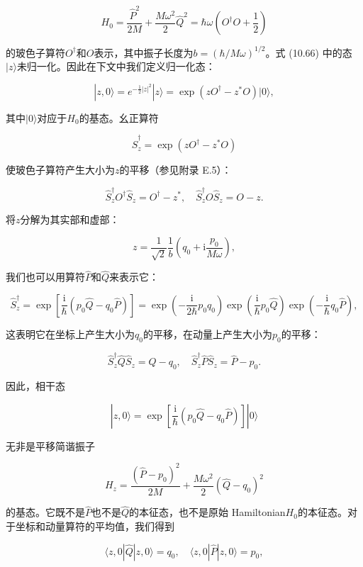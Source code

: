 \[
H_{0}=\frac{\hat{P}^{2}}{2M}+\frac{M\omega^{2}}{2}\hat{Q}^{2}=\hbar\omega\left(O^{\dagger}O+\frac{1}{2}\right)
\]

的玻色子算符$O^{\dagger}$和$O$表示，其中振子长度为$b=(\hbar/M\omega)^{1/2}$。式 (10.66)
中的态$|z\rangle$未归一化。因此在下文中我们定义归一化态：

\[
|z,0\rangle=e^{-\frac{1}{2}|z|^{2}}|z\rangle=\exp(zO^{\dagger}-z^{*}O)|0\rangle,
\]

其中$|0\rangle$对应于$H_{0}$的基态。幺正算符

\[
\hat{S}^{\dagger}_{z}=\exp(zO^{\dagger}-z^{*}O)
\]

使玻色子算符产生大小为$z$的平移（参见附录 E.5）：

\[
\hat{S}^{\dagger}_{z}O^{\dagger}\hat{S}_{z}=O^{\dagger}-z^{*},\quad\hat{S}^{\dagger}_{z}O\hat{S}_{z}=O-z.
\]

将$z$分解为其实部和虚部：

\[
z=\frac{1}{\sqrt{2}}\frac{1}{b}\left(q_{0}+\mathrm{i}\frac{p_{0}}{M\omega}\right),
\]

我们也可以用算符$\hat{P}$和$\hat{Q}$来表示它：

\[
\hat{S}^{\dagger}_{z}=\exp\left[\frac{\mathrm{i}}{\hbar}(p_{0}\hat{Q}-q_{0}\hat{P})\right]=\exp\left(-\frac{\mathrm{i}}{2\hbar}p_{0}q_{0}\right)\exp\left(\frac{\mathrm{i}}{\hbar}p_{0}\hat{Q}\right)\exp\left(-\frac{\mathrm{i}}{\hbar}q_{0}\hat{P}\right),
\]

这表明它在坐标上产生大小为$q_{0}$的平移，在动量上产生大小为$p_{0}$的平移：

\[
\hat{S}^{\dagger}_{z}\hat{Q}\hat{S}_{z}=\hat{Q}-q_{0},\quad\hat{S}^{\dagger}_{z}\hat{P}\hat{S}_{z}=\hat{P}-p_{0}.
\]

因此，相干态

\begin{equation}
|z,0\rangle=\exp\left[\frac{\mathrm{i}}{\hbar}(p_{0}\hat{Q}-q_{0}\hat{P})\right]|0\rangle\label{eq:10.84}
\end{equation}

无非是平移简谐振子

\begin{equation}
H_{z}=\frac{(\hat{P}-p_{0})^{2}}{2M}+\frac{M\omega^{2}}{2}(\hat{Q}-q_{0})^{2}\label{eq:10.85}
\end{equation}

的基态。它既不是$\hat{P}$也不是$\hat{Q}$的本征态，也不是原始 Hamiltonian$H_{0}$的本征态。对于坐标和动量算符的平均值，我们得到

\[
\langle z,0|\hat{Q}|z,0\rangle=q_{0},\quad\langle z,0|\hat{P}|z,0\rangle=p_{0},
\]

